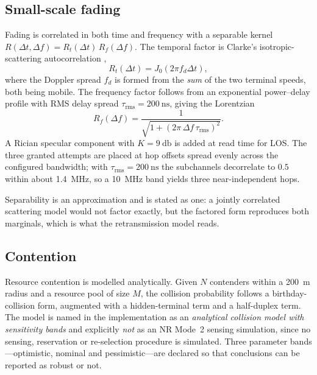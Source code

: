 \documentclass[conference]{IEEEtran}
\begin{document}
\subsection{Small-scale fading}

Fading is correlated in both time and frequency with a separable kernel
$R(\Delta t,\Delta f)=R_t(\Delta t)\,R_f(\Delta f)$. The temporal factor is
Clarke's isotropic-scattering autocorrelation \cite{clarke1968},
\begin{equation}
R_t(\Delta t) = J_0(2\pi f_d \Delta t),
\end{equation}
where the Doppler spread $f_d$ is formed from the \emph{sum} of the two
terminal speeds, both being mobile. The frequency factor follows from an
exponential power--delay profile with RMS delay spread
$\tau_{\mathrm{rms}}=\SI{200}{\nano\second}$, giving the Lorentzian
\begin{equation}
R_f(\Delta f) = \frac{1}{\sqrt{1+(2\pi\,\Delta f\,\tau_{\mathrm{rms}})^{2}}}.
\end{equation}
A Rician specular component with $K=\SI{9}{\decibel}$ is added at read time
for LOS. The three granted attempts are placed at hop offsets spread evenly
across the configured bandwidth; with $\tau_{\mathrm{rms}}=\SI{200}{\nano
\second}$ the subchannels decorrelate to $0.5$ within about
\SI{1.4}{\mega\hertz}, so a \SI{10}{\mega\hertz} band yields three
near-independent hops.

Separability is an approximation and is stated as one: a jointly correlated
scattering model would not factor exactly, but the factored form reproduces
both marginals, which is what the retransmission model reads.

\subsection{Contention}

Resource contention is modelled analytically. Given $N$ contenders within a
\SI{200}{\meter} radius and a resource pool of size $M$, the collision
probability follows a birthday-collision form, augmented with a hidden-terminal
term and a half-duplex term. The model is named in the implementation as an
\emph{analytical collision model with sensitivity bands} and explicitly
\emph{not} as an NR Mode~2 sensing simulation, since no sensing, reservation
or re-selection procedure is simulated. Three parameter bands---optimistic,
nominal and pessimistic---are declared so that conclusions can be reported as
robust or not.
\end{document}
